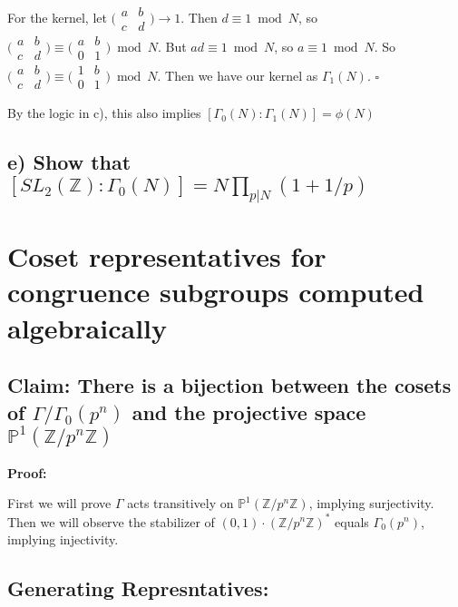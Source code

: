 \documentclass[11pt, oneside]{article}   	%
\begin{document}
For the kernel, let $\bigl( \begin{smallmatrix}a & b\\ c & d\end{smallmatrix}\bigr)\rightarrow 1$. Then $d\equiv 1 \bmod N$, so $\bigl( \begin{smallmatrix}a & b\\ c & d\end{smallmatrix}\bigr)\equiv \bigl( \begin{smallmatrix}a & b\\ 0 & 1\end{smallmatrix}\bigr)\bmod N$. But $ad\equiv 1\bmod N$, so $a\equiv 1 \bmod N$. So $\bigl( \begin{smallmatrix}a & b\\ c & d\end{smallmatrix}\bigr) \equiv \bigl( \begin{smallmatrix}1 & b\\ 0 & 1\end{smallmatrix}\bigr)\bmod N$. Then we have our kernel as $\Gamma_1 (N)$. $\square$

By the logic in c), this also implies $[\Gamma_0 (N):\Gamma_1 (N)]=\phi(N)$

\subsection*{e) Show that $[SL_2(\mathbb{Z}):\Gamma_0 (N)]=N\prod_{p\vert N} (1+1/p)$}

\section*{Coset representatives for congruence subgroups computed algebraically}

\subsection*{Claim: There is a bijection between the cosets of $\Gamma/\Gamma_0 (p^n)$ and the projective space $\mathbb{P}^1(\mathbb{Z}/p^n\mathbb{Z})$}

\textbf{Proof:}

First we will prove $\Gamma$ acts transitively on $\mathbb{P}^1(\mathbb{Z}/p^n\mathbb{Z})$, implying surjectivity. Then we will observe the stabilizer of $(0,1)\cdot(\mathbb{Z}/p^n\mathbb{Z})^*$ equals $\Gamma_0 (p^n)$, implying injectivity.

\subsection*{Generating Represntatives:}
\end{document}
